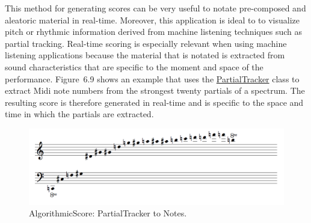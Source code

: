 This method for generating scores can be very useful to notate pre-composed and aleatoric material in real-time. Moreover, this application is ideal to to visualize pitch or rhythmic information derived from machine listening techniques such as partial tracking. Real-time scoring is especially relevant when using machine listening applications because the material that is notated is extracted from sound characteristics that are specific to the moment and space of the performance. \mbox{Figure 6.9} shows an example that uses the \hyperlink{partrack}{PartialTracker} class to extract Midi note numbers from the strongest twenty partials of a spectrum. The resulting score is therefore generated in real-time and is specific to the space and time in which the partials are extracted.
\begin{figure}[htbp] %
   \centering
   \includegraphics[width=17cm]{Chapter6/algoScore_partials.tif} %
   \caption{AlgorithmicScore: PartialTracker to Notes.}
   \label{fig:example}
\end{figure}\

